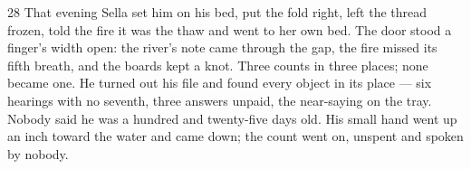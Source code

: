 \begin{CRchronicle}{28}
That evening Sella set him on his bed, put the fold right, left the thread frozen, told the fire it was the thaw and went to her own bed. The door stood a finger’s width open: the river’s note came through the gap, the fire missed its fifth breath, and the boards kept a knot. Three counts in three places; none became one. He turned out his file and found every object in its place --- six hearings with no seventh, three answers unpaid, the near-saying on the tray. Nobody said he was a hundred and twenty-five days old. His small hand went up an inch toward the water and came down; the count went on, unspent and spoken by nobody.
\end{CRchronicle}
